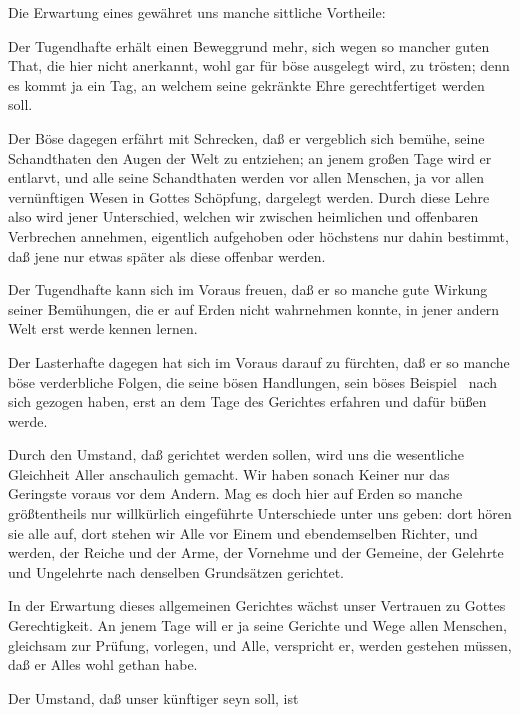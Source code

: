 \begin{aufza}
\begin{aufzb}
\end{aufzb}
\item Die Erwartung eines  gewähret uns manche sittliche Vortheile:
\begin{aufzb}
\item Der Tugendhafte erhält einen Beweggrund mehr, sich wegen so mancher guten That, die hier nicht anerkannt, wohl gar für böse ausgelegt wird, zu trösten; denn es kommt ja ein Tag, an welchem seine gekränkte Ehre gerechtfertiget werden soll.
\item Der Böse dagegen erfährt mit Schrecken, daß er vergeblich sich bemühe, seine Schandthaten den Augen der Welt zu entziehen; an jenem großen Tage wird er entlarvt, und alle seine Schandthaten werden vor allen Menschen, ja vor allen vernünftigen Wesen in Gottes Schöpfung, dargelegt werden. Durch diese Lehre also wird jener Unterschied, welchen wir zwischen heimlichen und offenbaren Verbrechen annehmen, eigentlich aufgehoben oder höchstens nur dahin bestimmt, daß jene nur etwas später als diese offenbar werden.
\item Der Tugendhafte kann sich im Voraus freuen, daß er so manche gute Wirkung seiner Bemühungen, die er auf Erden nicht wahrnehmen konnte, in jener andern Welt erst werde kennen lernen.
\item Der Lasterhafte dagegen hat sich im Voraus darauf zu fürchten, daß er so manche böse verderbliche Folgen, die seine bösen Handlungen, sein böses Beispiel \usw\ nach sich gezogen haben, erst an dem Tage des Gerichtes erfahren und dafür büßen werde.
\item Durch den Umstand, daß  gerichtet werden sollen, wird uns die wesentliche Gleichheit Aller anschaulich gemacht. Wir haben sonach Keiner nur das Geringste voraus vor dem Andern. Mag es doch hier auf Erden so manche größtentheils nur willkürlich eingeführte Unterschiede unter uns geben: dort hören sie alle auf, dort stehen wir Alle vor Einem und ebendemselben Richter, und werden, der Reiche und der Arme, der Vornehme und der Gemeine, der Gelehrte und Ungelehrte nach denselben Grundsätzen gerichtet.~ 
\item In der Erwartung dieses allgemeinen Gerichtes wächst unser Vertrauen zu Gottes Gerechtigkeit. An jenem Tage will er ja seine Gerichte und Wege allen Menschen, gleichsam zur Prüfung, vorlegen, und Alle, verspricht er, werden gestehen müssen, daß er Alles wohl gethan habe.
\item Der Umstand, daß unser künftiger  seyn soll, ist

\end{aufzb}
\end{aufza}
